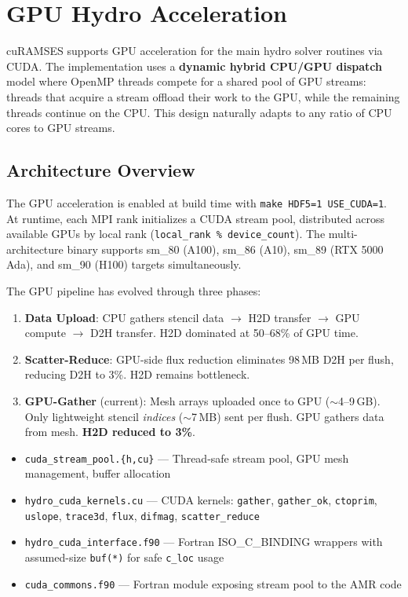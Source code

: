 \documentclass[11pt,fleqn]{book}
\begin{document}
\chapter{GPU Hydro Acceleration}
\label{ch:gpu}

cuRAMSES supports GPU acceleration for the main hydro solver routines via CUDA.  The implementation uses a \textbf{dynamic hybrid CPU/GPU dispatch} model where OpenMP threads compete for a shared pool of GPU streams: threads that acquire a stream offload their work to the GPU, while the remaining threads continue on the CPU.  This design naturally adapts to any ratio of CPU cores to GPU streams.

\section{Architecture Overview}

The GPU acceleration is enabled at build time with \texttt{make HDF5=1 USE\_CUDA=1}.  At runtime, each MPI rank initializes a CUDA stream pool, distributed across available GPUs by local rank (\texttt{local\_rank \% device\_count}).  The multi-architecture binary supports sm\_80 (A100), sm\_86 (A10), sm\_89 (RTX 5000 Ada), and sm\_90 (H100) targets simultaneously.

The GPU pipeline has evolved through three phases:
\begin{enumerate}[nosep]
\item \textbf{Data Upload}: CPU gathers stencil data $\to$ H2D transfer $\to$ GPU compute $\to$ D2H transfer.  H2D dominated at 50--68\% of GPU time.
\item \textbf{Scatter-Reduce}: GPU-side flux reduction eliminates 98\,MB D2H per flush, reducing D2H to 3\%.  H2D remains bottleneck.
\item \textbf{GPU-Gather} (current): Mesh arrays uploaded once to GPU ($\sim$4--9\,GB).  Only lightweight stencil \emph{indices} ($\sim$7\,MB) sent per flush.  GPU gathers data from mesh.  \textbf{H2D reduced to 3\%}.
\end{enumerate}

\begin{infobox}
\begin{itemize}[nosep,leftmargin=1.5em]
\item \texttt{cuda\_stream\_pool.\{h,cu\}} --- Thread-safe stream pool, GPU mesh management, buffer allocation
\item \texttt{hydro\_cuda\_kernels.cu} --- CUDA kernels: \texttt{gather}, \texttt{gather\_ok}, \texttt{ctoprim}, \texttt{uslope}, \texttt{trace3d}, \texttt{flux}, \texttt{difmag}, \texttt{scatter\_reduce}
\item \texttt{hydro\_cuda\_interface.f90} --- Fortran ISO\_C\_BINDING wrappers with assumed-size \texttt{buf(*)} for safe \texttt{c\_loc} usage
\item \texttt{cuda\_commons.f90} --- Fortran module exposing stream pool to the AMR code
\end{itemize}
\end{infobox}
\end{document}
